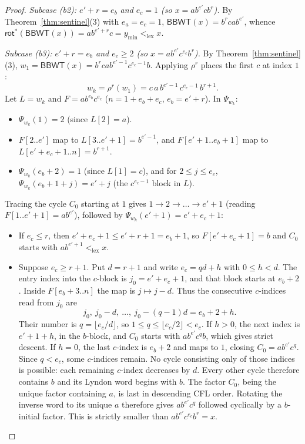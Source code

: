 \documentclass[11pt,a4paper]{article}
\theoremstyle{definition}
\newcommand{\BBWT}{\mathsf{BBWT}}
\newcommand{\rot}{\mathsf{rot}}
\newcommand{\lex}{\mathrm{lex}}
\begin{document}
\begin{proof}
\emph{Subcase (b2): $e' + r = e_b$ and $e_c = 1$ (so $x = a b^{e'} c b^r$).}
By Theorem~\ref{thm:sentinel}(3) with $e_a = e_c = 1$, $\BBWT(x) = b^r c a b^{e'}$, whence $\rot^*(\BBWT(x)) = a b^{e'+r} c = y_{\min} <_{\lex} x$.

\emph{Subcase (b3): $e' + r = e_b$ and $e_c \ge 2$ (so $x = a b^{e'} c^{e_c} b^r$).}
By Theorem~\ref{thm:sentinel}(3), $w_1 = \BBWT(x) = b^r c a b^{e'-1} c^{e_c - 1} b$. Applying $\rho^r$ places the first $c$ at index $1$:
\[
w_k = \rho^r(w_1) = c \, a \, b^{e'-1} \, c^{e_c - 1} \, b^{r+1}.
\]
Let $L = w_k$ and $F = a b^{e_b} c^{e_c}$ ($n = 1 + e_b + e_c$, $e_b = e' + r$). In $\Psi_{w_k}$:
\begin{itemize}[leftmargin=*]
    \item $\Psi_{w_k}(1) = 2$ (since $L[2] = a$).
    \item $F[2..e']$ map to $L[3..e'+1] = b^{e'-1}$, and $F[e'+1..e_b+1]$ map to $L[e'+e_c+1..n] = b^{r+1}$.
    \item $\Psi_{w_k}(e_b + 2) = 1$ (since $L[1] = c$), and for $2 \le j \le e_c$, $\Psi_{w_k}(e_b + 1 + j) = e' + j$ (the $c^{e_c - 1}$ block in $L$).
\end{itemize}
Tracing the cycle $C_0$ starting at $1$ gives $1 \to 2 \to \dots \to e'+1$ (reading $F[1..e'+1] = a b^{e'}$), followed by $\Psi_{w_k}(e'+1) = e' + e_c + 1$:
\begin{itemize}[leftmargin=*]
    \item If $e_c \le r$, then $e' + e_c + 1 \le e' + r + 1 = e_b + 1$, so $F[e'+e_c+1] = b$ and $C_0$ starts with $a b^{e'+1} <_{\lex} x$.
    \item Suppose $e_c\ge r+1$. Put $d=r+1$ and write $e_c=qd+h$ with $0\le h<d$. The entry index into the $c$-block is $j_0=e'+e_c+1$, and that block starts at $e_b+2$. Inside $F[e_b+3..n]$ the map is $j\mapsto j-d$. Thus the consecutive $c$-indices read from $j_0$ are
    \[
    j_0,\ j_0-d,\ \dots,\ j_0-(q-1)d=e_b+2+h.
    \]
    Their number is $q=\lfloor e_c/d\rfloor$, so $1\le q\le\lfloor e_c/2\rfloor<e_c$.
    If $h>0$, the next index is $e'+1+h$, in the $b$-block, and $C_0$ starts with $ab^{e'}c^q b$, which gives strict descent.
    If $h=0$, the last $c$-index is $e_b+2$ and maps to $1$, closing $C_0=ab^{e'}c^q$. Since $q<e_c$, some $c$-indices remain. No cycle consisting only of those indices is possible: each remaining $c$-index decreases by $d$. Every other cycle therefore contains $b$ and its Lyndon word begins with $b$. The factor $C_0$, being the unique factor containing $a$, is last in descending CFL order. Rotating the inverse word to its unique $a$ therefore gives $ab^{e'}c^q$ followed cyclically by a $b$-initial factor. This is strictly smaller than $ab^{e'}c^{e_c}b^r=x$.
\end{itemize}


\end{proof}
\end{document}
